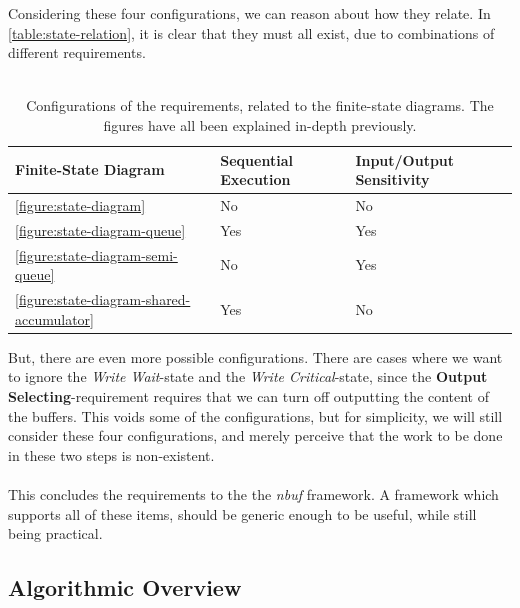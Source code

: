 \documentclass[a4paper]{article}
\newcommand{\nbuf}{\textit{nbuf} }
\begin{document}
Considering these four configurations, we can reason about how they relate. In \autoref{table:state-relation}, it is clear that they must all exist, due to combinations of different requirements.\\\\

\begin{table}[]
\begin{adjustwidth}{-0.5in}{-0.5in}
\centering
\begin{tabular}{@{}lll@{}}
\toprule
\textbf{Finite-State Diagram}                     & \textbf{Sequential Execution} & \textbf{Input/Output Sensitivity} \\ \midrule
\autoref{figure:state-diagram}                    & No                            & No                                \\ \midrule
\autoref{figure:state-diagram-queue}              & Yes                           & Yes                               \\ \midrule
\autoref{figure:state-diagram-semi-queue}         & No                            & Yes                               \\ \midrule
\autoref{figure:state-diagram-shared-accumulator} & Yes                           & No                                \\ \bottomrule
\end{tabular}
\caption{Configurations of the requirements, related to the finite-state diagrams. The figures have all been explained in-depth previously.}
\label{table:state-relation}
\end{adjustwidth}
\end{table}


But, there are even more possible configurations. There are cases where we want to ignore the \textit{Write Wait}-state and the \textit{Write Critical}-state, since the \textbf{Output Selecting}-requirement requires that we can turn off outputting the content of the buffers. This voids some of the configurations, but for simplicity, we will still consider these four configurations, and merely perceive that the work to be done in these two steps is non-existent.\\\\

This concludes the requirements to the the \nbuf framework. A framework which supports all of these items, should be generic enough to be useful, while still being practical.


\subsection{Algorithmic Overview}
\end{document}
